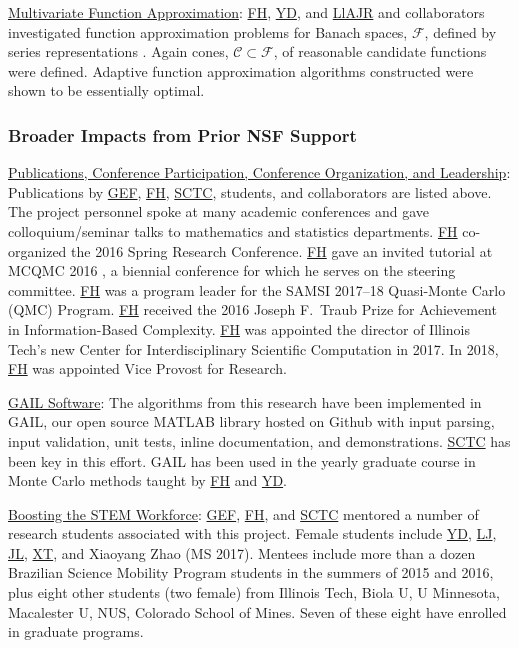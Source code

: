 \documentclass[11pt]{NSFamsart}
\newcommand{\Upara}[1]{\noindent\underline{\upshape #1}:}
\newcommand{\FH}{\hyperlink{FHlink}{FH}\xspace}
\newcommand{\SCTC}{\hyperlink{SCTClink}{SCTC}\xspace}
\newcommand{\GEF}{\hyperlink{GEFlink}{GEF}\xspace}
\newcommand{\YD}{\hyperlink{YDlink}{YD}\xspace}
\newcommand{\LlAJR}{\hyperlink{LlAJRlink}{LlAJR}\xspace}
\newcommand{\LJ}{\hyperlink{LJlink}{LJ}\xspace}
\newcommand{\XT}{\hyperlink{XTlink}{XT}\xspace}
\newcommand{\JL}{\hyperlink{JLlink}{JL}\xspace}
\newcommand{\GAIL}{GAIL\xspace}
\newcommand{\MATLAB}{MATLAB\xspace}
\newcommand{\Rlang}{R\xspace}
\newcommand{\calc}{{\mathcal{C}}}
\newcommand{\calf}{{\mathcal{F}}}
\begin{document}
\Upara{Multivariate Function Approximation}
\FH, \YD, and \LlAJR and collaborators investigated function approximation problems for Banach spaces, $\calf$, defined by series representations \cite{DinHic20a,DinEtal20a}.  Again cones, $\calc \subset \calf$, of reasonable candidate functions were defined.  Adaptive function approximation algorithms constructed were shown to be essentially optimal.


\subsubsection{Broader Impacts from Prior NSF Support} \label{prevBIsect}
\phantom{a}

\Upara{Publications, Conference Participation, Conference Organization, and Leadership} Publications by \GEF, \FH,  \SCTC, students, and collaborators are listed above.  The project personnel spoke at many academic conferences and gave colloquium/seminar talks to mathematics and
statistics departments.  \FH co-organized the
2016 Spring Research
Conference.   \FH gave an invited tutorial
at MCQMC 2016
\cite{Hic17a}, a biennial conference for which he serves on the steering committee.  \FH
was a program leader for the SAMSI 2017--18 Quasi-Monte Carlo (QMC) Program.   \FH received the 2016 Joseph F.\ Traub Prize for Achievement in Information-Based Complexity.  \FH was appointed the director of Illinois Tech's new Center for Interdisciplinary
Scientific Computation in 2017.  In 2018, \FH was appointed Vice Provost for Research.

\Upara{\GAIL Software} The algorithms from this research have been implemented in
\GAIL, our open source \MATLAB library hosted on
Github with input parsing, input validation, unit tests, inline documentation, and
demonstrations. \SCTC has been key in this effort.  \GAIL has been used in the yearly graduate course in Monte Carlo methods taught by \FH and \YD.

\Upara{Boosting the STEM Workforce} \GEF, \FH, and \SCTC mentored a number of
research students associated with this project.  Female students include \YD, \LJ, \JL, \XT, and Xiaoyang Zhao (MS 2017).   Mentees include more than a dozen
Brazilian Science Mobility Program students in the summers of 2015 and 2016, plus eight other students (two female) from Illinois Tech, Biola U, U Minnesota, Macalester U, NUS, Colorado School of Mines.  Seven of these eight have enrolled in graduate programs.  
\end{document}
